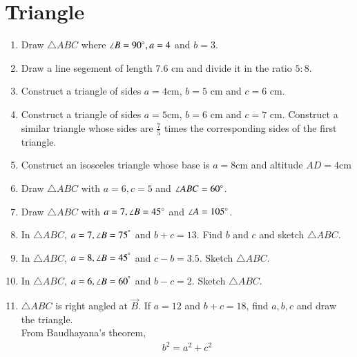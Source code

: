 \documentclass[journal,12pt,twocolumn]{IEEEtran}
\renewcommand\thesection{\arabic{section}}
\begin{document}
\section{Triangle}
\begin{enumerate}[label=\thesection.\arabic*
,ref=\thesection.\theenumi]
\item Draw $\triangle ABC$ where $\angle B = 90\degree, a = 4$ and $b = 3$.
\item Draw a line segement of length 7.6 cm and divide it in the ratio $5:8$.
\item Construct a triangle of sides $a=4$cm, $b=5$ cm and $c=6$ cm.  
\item Construct a triangle of sides $a=5$cm, $b=6$ cm and $c=7$ cm.  Construct a similar triangle whose sides are $\frac{7}{5}$ times the corresponding sides of the first triangle.
\item Construct an isosceles triangle whose base is $a=8$cm and altitude $AD=4$cm 
\item Draw $\triangle ABC$ with $a = 6, c = 5$ and $\angle ABC = 60 \degree$. 
\item Draw $\triangle ABC$ with $a = 7, \angle B = 45\degree$ and $\angle A = 105 \degree$. 
\item In $\triangle ABC$,  $a = 7, \angle B = 75^{\degree}$ and $b+c = 13$. 
Find $b$ and $c$ and sketch $\triangle ABC$.
\item In $\triangle ABC$,  $a = 8, \angle B = 45^{\degree}$ and $c-b = 3.5$.
Sketch $\triangle ABC$.
\item In $\triangle ABC$,  $a = 6, \angle B = 60^{\degree}$ and $b-c = 2$. 
Sketch $\triangle ABC$.
\item $\triangle ABC$ is right angled at $\vec{B}$.  If $a = 12$ and $b+c = 18$, find $a,b,c$ and draw the triangle.
\\
\solution From Baudhayana's theorem, 
\begin{align}
b^2 = a^2 + c^2
\end{align}

\end{enumerate}
\end{document}
